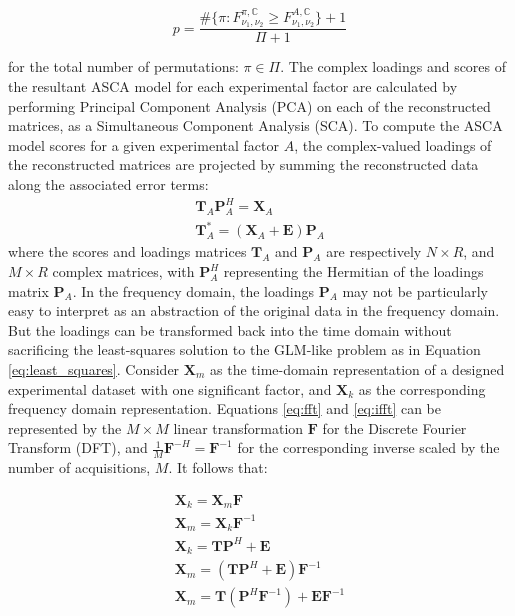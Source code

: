 \documentclass[preprint,12pt]{elsarticle}
\begin{document}
\begin{equation}\label{eq:perm2}
p = \frac{\#\{\pi:F^{\pi,\mathbb{C}}_{\nu_1,\nu_2} \geq F^{A,\mathbb{C}}_{\nu_1,\nu_2}\} + 1}{\Pi+1}
\end{equation}

\noindent for the total number of permutations: $\pi \in \Pi$. The complex loadings and scores of the resultant ASCA model for each experimental factor are calculated by performing Principal Component Analysis (PCA) on each of the reconstructed matrices, as a Simultaneous Component Analysis (SCA). To compute the ASCA model scores for a given experimental factor $A$, the complex-valued loadings of the reconstructed matrices are projected by summing the reconstructed data along the associated error terms:
%
\begin{align}\label{eq:asca}
    \mathbf{T}_A\mathbf{P}_A^H = \mathbf{X}_A \\
    \mathbf{T}^*_A = (\mathbf{X}_A + \mathbf{E})\mathbf{P}_A
\end{align}
%
\noindent where the scores and loadings matrices $\mathbf{T}_A$ and $\mathbf{P}_A$ are respectively $N \times R$, and $M \times R$ complex matrices, with $\mathbf{P}_A^H$ representing the Hermitian of the loadings matrix $\mathbf{P}_A$. In the frequency domain, the loadings $\mathbf{P}_A$ may not be particularly easy to interpret as an abstraction of the original data in the frequency domain. But the loadings can be transformed back into the time domain without sacrificing the least-squares solution to the GLM-like problem as in Equation \ref{eq:least_squares}. Consider $\mathbf{X}_m$ as the time-domain representation of a designed experimental dataset with one significant factor, and $\mathbf{X}_k$ as the corresponding frequency domain representation. Equations \ref{eq:fft} and \ref{eq:ifft} can be represented by the $M\times M$ linear transformation $\mathbf{F}$ for the Discrete Fourier Transform (DFT), and $\frac{1}{M}\mathbf{F}^{-H} = \mathbf{F}^{-1}$ for the corresponding inverse scaled by the number of acquisitions, $M$. It follows that:

\begin{align}\label{eq:least_squares}
    \mathbf{X}_k = \mathbf{X}_m\mathbf{F}\\
    \mathbf{X}_m = \mathbf{X}_k\mathbf{F}^{-1}\\
    \mathbf{X}_k = \mathbf{T}\mathbf{P}^H + \mathbf{E}\\
    \mathbf{X}_m = \left(\mathbf{T}\mathbf{P}^H + \mathbf{E}\right)\mathbf{F}^{-1}\\
    \mathbf{X}_m = \mathbf{T}\left(\mathbf{P}^H\mathbf{F}^{-1}\right) + \mathbf{E}\mathbf{F}^{-1}
\end{align}
\end{document}
